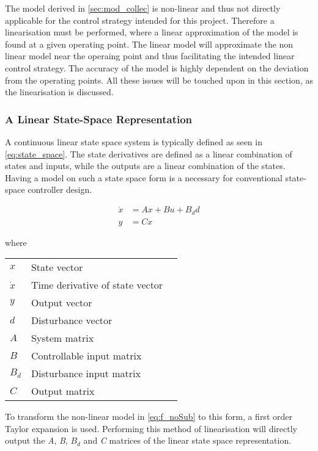 The model derived in \cref{sec:mod_collec} is non-linear and thus not directly applicable for the control strategy intended for this project. Therefore a linearisation must be performed, where a linear approximation of the model is found at a given operating point. The linear model will approximate the non linear model near the operaing point and thus facilitating the intended linear control strategy. The accuracy of the model is highly dependent on the deviation from the operating points. All these issues will be touched upon in this section, as the linearisation is discussed.

\subsubsection{A Linear State-Space Representation}
A continuous linear state space system is typically defined as seen in \cref{eq:state_space}. The state derivatives are defined as a linear combination of states and inputs, while the outputs are a linear combination of the states. Having a model on such a state space form is a necessary for conventional state-space controller design.

\begin{equation} \label{eq:state_space}
	\begin{split}
		\dot{x} & = Ax + Bu + B_dd \\
		y 		& = Cx
	\end{split}
\end{equation}

where

\begin{center}
	\begin{tabular}{l p{8cm} l}
		$x$       & State vector                    &  \\
		$\dot{x}$ & Time derivative of state vector &  \\
		$y$       & Output vector                   &  \\
		$d$       & Disturbance vector              &  \\
		$A$       & System matrix                   &  \\
		$B$       & Controllable input matrix       &  \\
		$B_d$     & Disturbance input matrix        &  \\
		$C$       & Output matrix                   &
	\end{tabular}
\end{center}

To transform the non-linear model in \cref{eq:f_noSub} to this form, a first order Taylor expansion is used. Performing this method of linearisation will directly output the \textit{A}, \textit{B}, \textit{$B_d$} and \textit{C} matrices of the linear state space representation.

